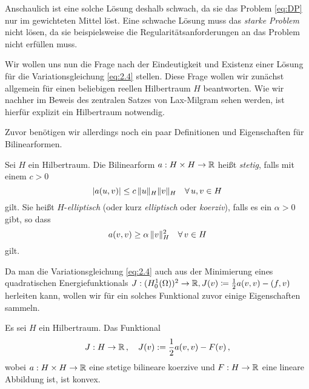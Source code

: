 Anschaulich ist eine solche Lösung deshalb schwach, da sie das Problem \eqref{eq:DP} nur im gewichteten Mittel löst. Eine schwache Lösung muss das \textit{starke Problem} nicht lösen, da sie beispielsweise die Regularitätsanforderungen an das Problem nicht erfüllen muss.

Wir wollen uns nun die Frage nach der Eindeutigkeit und Existenz einer Lösung für die Variationsgleichung \eqref{eq:2.4} stellen. Diese Frage wollen wir zunächst allgemein für einen beliebigen reellen Hilbertraum $H$ beantworten. Wie wir nachher im Beweis des zentralen Satzes von Lax-Milgram sehen werden, ist hierfür explizit ein Hilbertraum notwendig.

Zuvor benötigen wir allerdings noch ein paar Definitionen und Eigenschaften für Bilinearformen.


\begin{defi}\label{def:2.9}
Sei $H$ ein Hilbertraum. Die Bilinearform  $a : H\times H \rightarrow \mathbb{R}$ heißt \textit{stetig}, falls mit einem $c>0$
\[
	\lvert a(u,v)\rvert \le c \, \lVert u\rVert_H   \lVert v\rVert_H \quad \forall \, u,v \in H
\]
gilt. Sie heißt $H$-\textit{elliptisch} (oder kurz \textit{elliptisch} oder \textit{koerziv}), falls es ein $\alpha > 0$ gibt, so dass
\[
	a(v,v) \ge \alpha \, \lVert v\rVert_H^2 \quad \forall \, v \in H 
\]
gilt.
\end{defi}


Da man die Variationsgleichung \eqref{eq:2.4} auch aus der Minimierung eines quadratischen Energiefunktionals $J: (H^1_0(\Omega))^2\rightarrow \mathbb{R}, J(v) \coloneqq \frac 12 a(v,v)-(f,v)$ herleiten kann, wollen wir für ein solches Funktional zuvor einige Eigenschaften sammeln.


\begin{lemma}\label{lem:2.10}
Es sei $H$ ein Hilbertraum. Das Funktional
\[
	J: H \rightarrow \mathbb{R} \, , \quad J(v) := \frac 1 2 a(v,v) - F(v) \, ,
\]
wobei $a: H\times H \rightarrow \mathbb{R}$ eine stetige bilineare koerzive und $F: H\rightarrow \mathbb{R}$ eine lineare Abbildung ist, ist konvex.
\end{lemma}

